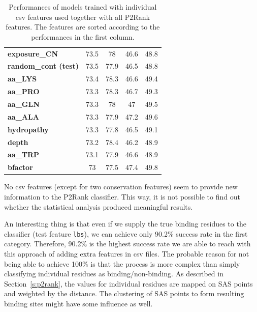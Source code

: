 \begin{table}[]
{\begin{tabular}{lcccc}
\textbf{exposure\_CN}         & 73.5           & 78                 & 46.6           & 48.8               \\
\textbf{random\_cont (test)}         & 73.5           & 77.9               & 46.5           & 48.8               \\
\textbf{aa\_LYS}              & 73.4           & 78.3               & 46.6           & 49.4               \\
\textbf{aa\_PRO}              & 73.3           & 78.3               & 46.7           & 49.3               \\
\textbf{aa\_GLN}              & 73.3           & 78                 & 47             & 49.5               \\
\textbf{aa\_ALA}              & 73.3           & 77.9               & 47.2           & 49.6               \\
\textbf{hydropathy}           & 73.3           & 77.8               & 46.5           & 49.1               \\
\textbf{depth}                & 73.2           & 78.4               & 46.2           & 48.9               \\
\textbf{aa\_TRP}              & 73.1           & 77.9               & 46.6           & 48.9               \\
\textbf{bfactor}              & 73             & 77.5               & 47.4           & 49.8               \\ \hline
\end{tabular}
}
\caption[Performances of models trained with individual csv features]{Performances of models trained with individual csv features used together with all P2Rank features. The features are sorted according to the performances in the first column.}
\label{tab:p2rankCSV}
\end{table}

No csv features (except for two conservation features) seem to provide new information to the P2Rank classifier. This way, it is not possible to find out whether the statistical analysis produced meaningful results.

An interesting thing is that even if we supply the true binding residues to the classifier (test feature \texttt{lbs}), we can achieve only 90.2\% success rate in the first category. Therefore, 90.2\% is the highest success rate we are able to reach with this approach of adding extra features in csv files. The probable reason for not being able to achieve 100\% is that the process is more complex than simply classifying individual residues as binding/non-binding. As described in Section~\ref{s:p2rank}, the values for individual residues are mapped on SAS points and weighted by the distance. The clustering of SAS points to form resulting binding sites might have some influence as well.


